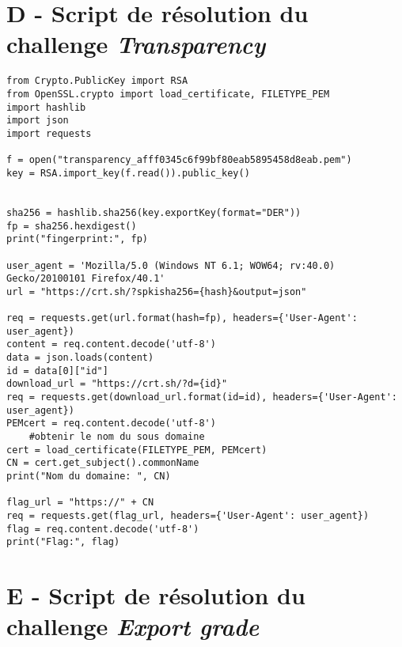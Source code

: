 \newpage %
\section*{D - Script de résolution du challenge \textit{Transparency}}
\label{annexe:script-transparency}

\begin{lstlisting}
from Crypto.PublicKey import RSA
from OpenSSL.crypto import load_certificate, FILETYPE_PEM
import hashlib
import json
import requests

f = open("transparency_afff0345c6f99bf80eab5895458d8eab.pem")
key = RSA.import_key(f.read()).public_key()


sha256 = hashlib.sha256(key.exportKey(format="DER"))
fp = sha256.hexdigest()
print("fingerprint:", fp)

user_agent = 'Mozilla/5.0 (Windows NT 6.1; WOW64; rv:40.0) Gecko/20100101 Firefox/40.1'
url = "https://crt.sh/?spkisha256={hash}&output=json"

req = requests.get(url.format(hash=fp), headers={'User-Agent': user_agent})
content = req.content.decode('utf-8')
data = json.loads(content)
id = data[0]["id"]
download_url = "https://crt.sh/?d={id}"
req = requests.get(download_url.format(id=id), headers={'User-Agent': user_agent})
PEMcert = req.content.decode('utf-8')
    #obtenir le nom du sous domaine
cert = load_certificate(FILETYPE_PEM, PEMcert) 
CN = cert.get_subject().commonName 
print("Nom du domaine: ", CN)

flag_url = "https://" + CN
req = requests.get(flag_url, headers={'User-Agent': user_agent})
flag = req.content.decode('utf-8')
print("Flag:", flag)
\end{lstlisting}

\newpage %
\section*{E - Script de résolution du challenge \textit{Export grade}}
\label{annexe:script-exportgrade}

